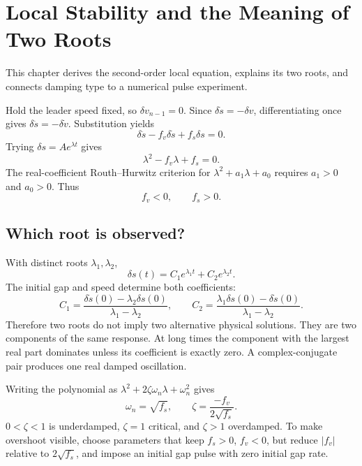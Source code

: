 \documentclass[11pt,a4paper,openany]{book}
\numberwithin{equation}{chapter}
\numberwithin{figure}{chapter}
\numberwithin{table}{chapter}
\newcommand{\chapterguide}[1]{\begin{tcolorbox}[keybox,title=Chapter guide]#1\end{tcolorbox}}
\begin{document}
\chapter{Local Stability and the Meaning of Two Roots}
\chapterguide{This chapter derives the second-order local equation, explains its two roots, and connects damping type to a numerical pulse experiment.}

Hold the leader speed fixed, so $\delta v_{n-1}=0$. Since $\delta\dot s=-\delta v$, differentiating once gives $\delta\ddot s=-\delta\dot v$. Substitution yields
\begin{equation}
\delta\ddot s-f_v\delta\dot s+f_s\delta s=0.
\end{equation}
Trying $\delta s=Ae^{\lambda t}$ gives
\begin{equation}
\lambda^2-f_v\lambda+f_s=0.
\end{equation}
The real-coefficient Routh--Hurwitz criterion for $\lambda^2+a_1\lambda+a_0$ requires $a_1>0$ and $a_0>0$. Thus
\begin{equation}
f_v<0,\qquad f_s>0.
\end{equation}

\section{Which root is observed?}
With distinct roots $\lambda_1,\lambda_2$,
\begin{equation}
\delta s(t)=C_1e^{\lambda_1t}+C_2e^{\lambda_2t}.
\end{equation}
The initial gap and speed determine both coefficients:
\begin{equation}
C_1=\frac{\delta\dot s(0)-\lambda_2\delta s(0)}{\lambda_1-\lambda_2},\qquad
C_2=\frac{\lambda_1\delta s(0)-\delta\dot s(0)}{\lambda_1-\lambda_2}.
\end{equation}
Therefore two roots do not imply two alternative physical solutions. They are two components of the same response. At long times the component with the largest real part dominates unless its coefficient is exactly zero. A complex-conjugate pair produces one real damped oscillation.

Writing the polynomial as $\lambda^2+2\zeta\omega_n\lambda+\omega_n^2$ gives
\begin{equation}
\omega_n=\sqrt{f_s},\qquad \zeta=\frac{-f_v}{2\sqrt{f_s}}.
\end{equation}
$0<\zeta<1$ is underdamped, $\zeta=1$ critical, and $\zeta>1$ overdamped. To make overshoot visible, choose parameters that keep $f_s>0$, $f_v<0$, but reduce $|f_v|$ relative to $2\sqrt{f_s}$, and impose an initial gap pulse with zero initial gap rate.
\end{document}

